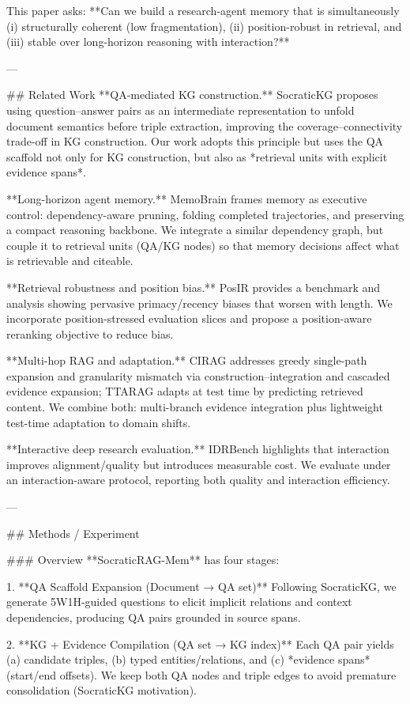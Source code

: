 This paper asks: **Can we build a research-agent memory that is simultaneously (i) structurally coherent (low fragmentation), (ii) position-robust in retrieval, and (iii) stable over long-horizon reasoning with interaction?**

---

## Related Work  
**QA-mediated KG construction.** SocraticKG proposes using question–answer pairs as an intermediate representation to unfold document semantics before triple extraction, improving the coverage–connectivity trade-off in KG construction. Our work adopts this principle but uses the QA scaffold not only for KG construction, but also as *retrieval units with explicit evidence spans*.

**Long-horizon agent memory.** MemoBrain frames memory as executive control: dependency-aware pruning, folding completed trajectories, and preserving a compact reasoning backbone. We integrate a similar dependency graph, but couple it to retrieval units (QA/KG nodes) so that memory decisions affect what is retrievable and citeable.

**Retrieval robustness and position bias.** PosIR provides a benchmark and analysis showing pervasive primacy/recency biases that worsen with length. We incorporate position-stressed evaluation slices and propose a position-aware reranking objective to reduce bias.

**Multi-hop RAG and adaptation.** CIRAG addresses greedy single-path expansion and granularity mismatch via construction–integration and cascaded evidence expansion; TTARAG adapts at test time by predicting retrieved content. We combine both: multi-branch evidence integration plus lightweight test-time adaptation to domain shifts.

**Interactive deep research evaluation.** IDRBench highlights that interaction improves alignment/quality but introduces measurable cost. We evaluate under an interaction-aware protocol, reporting both quality and interaction efficiency.

---

## Methods / Experiment  

### Overview  
**SocraticRAG-Mem** has four stages:

1. **QA Scaffold Expansion (Document → QA set)**  
   Following SocraticKG, we generate 5W1H-guided questions to elicit implicit relations and context dependencies, producing QA pairs grounded in source spans.

2. **KG + Evidence Compilation (QA set → KG index)**  
   Each QA pair yields (a) candidate triples, (b) typed entities/relations, and (c) *evidence spans* (start/end offsets). We keep both QA nodes and triple edges to avoid premature consolidation (SocraticKG motivation).


